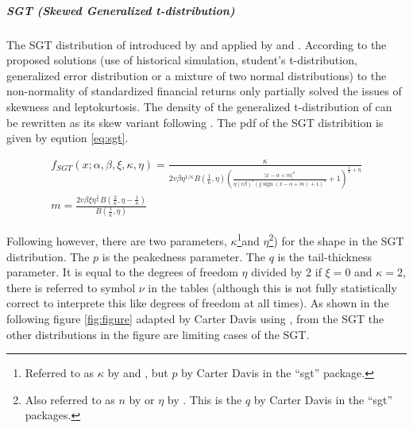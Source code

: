 \documentclass[a4paper, twoside]{templates/ociamthesis}
\begin{document}
\hypertarget{sgt-skewed-generalized-t-distribution}{%
\subparagraph{SGT (Skewed Generalized t-distribution)}\label{sgt-skewed-generalized-t-distribution}}

\noindent The SGT distribution of introduced by \textcite{theodossiou1998} and applied by \textcite{bali2007} and \textcite{bali2008}. According to \textcite{bali2008} the proposed solutions (use of historical simulation, student's t-distribution, generalized error distribution or a mixture of two normal distributions) to the non-normality of standardized financial returns only partially solved the issues of skewness and leptokurtosis. The density of the generalized t-distribution of \textcite{mcdonald1988} can be rewritten as its skew variant following \textcite{trottier2015}. The pdf of the SGT distribition is given by eqution \eqref{eq:sgt}.

\begin{equation}
\begin{array}{c}
f_{S G T}(x ; \alpha, \beta, \xi, \kappa, \eta)=\frac{\kappa}{2 v \beta \eta^{1 / \kappa} B\left(\frac{1}{\kappa}, \eta\right)\left(\frac{|x-\alpha +m|^{\kappa}}{\eta(v \beta)^{\kappa}(\xi \operatorname{sign}(x-\alpha+m)+1)^{\kappa}}+1\right)^{\frac{1}{\kappa}+\eta}} \\
m=\frac{2 v \beta \xi \eta^{\frac{1}{\kappa}} B\left(\frac{2}{\kappa}, \eta-\frac{1}{\kappa}\right)}{B\left(\frac{1}{\kappa}, \eta\right)}
\end{array}
\label{eq:sgt}
\end{equation}

\noindent Following \textcite{theodossiou1998} however, there are two parameters, \(\kappa\)\footnote{Referred to as \(\kappa\) by \textcite{theodossiou1998} and \textcite{bali2008}, but \(p\) by Carter Davis in the ``sgt'' package.}and \(\eta\)\footnote{Also referred to as \(n\) by \textcite{theodossiou1998} or \(\eta\) by \textcite{bali2008}. This is the \(q\) by Carter Davis in the ``sgt'' packages.}) for the shape in the SGT distribution. The \(p\) is the peakedness parameter. The \(q\) is the tail-thickness parameter. It is equal to the degrees of freedom \(\eta\) divided by 2 if \(\xi = 0\) and \(\kappa = 2\), there is referred to symbol \(\nu\) in the tables (although this is not fully statistically correct to interprete this like degrees of freedom at all times). As shown in the following figure \ref{fig:figure} adapted by Carter Davis using , from the SGT the other distributions in the figure are limiting cases of the SGT.
\end{document}
